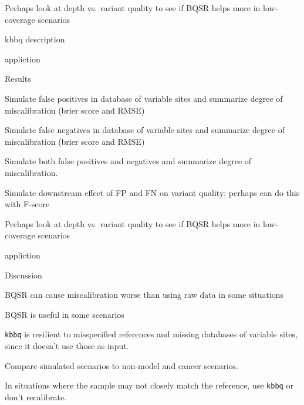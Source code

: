 \documentclass{article}
\begin{document}
\begin{outline}
\begin{outline}
		\item Perhaps look at depth vs. variant quality to see if BQSR helps more in low-coverage scenarios
		\item kbbq description
		\item appliction
	\end{outline}
	\item Results
	\begin{outline}
		\item Simulate false positives in database of variable sites and summarize degree of miscalibration (brier score and RMSE)
		\item Simulate false negatives in database of variable sites and summarize degree of miscalibration (brier score and RMSE)
		\item Simulate both false positives and negatives and summarize degree of miscalibration.
		\item Simulate downstream effect of FP and FN on variant quality; perhaps can do this with F-score
		\item Perhaps look at depth vs. variant quality to see if BQSR helps more in low-coverage scenarios
		\item appliction
	\end{outline}
	\item Discussion
	\begin{outline}
		\item BQSR can cause miscalibration worse than using raw data in some situations
		\item BQSR is useful in some scenarios
		\item \texttt{kbbq} is resilient to misspecified references and missing databases of variable sites, since it doesn't use those as input.
		\item Compare simulated scenarios to non-model and cancer scenarios.
		\begin{outline}
			\item In situations where the sample may not closely match the reference, use \texttt{kbbq} or don't recalibrate.
		\end{outline}
	\end{outline}
\end{outline}
\end{document}

